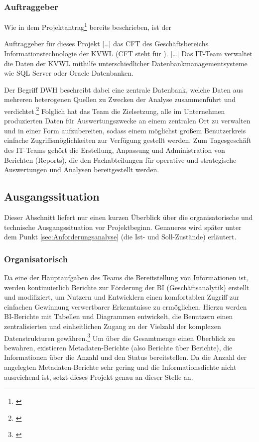 \subsubsection{Auftraggeber}\label{sec:Auftraggeber}
Wie in dem Projektantrag\footnote{\cite{Projektantrag}} bereits beschrieben, ist der
\begin{displayquote}
	Auftraggeber für dieses Projekt [\ldots] das \acs{CFT} \teamName des Geschäftsbereichs Informationstechnologie der \ac{KVWL} (\acs{CFT} steht für ).
	[\ldots]
	Das IT-Team \teamName verwaltet die Daten der \ac{KVWL} mithilfe unterschiedlicher Datenbankmanagementsysteme wie SQL Server oder Oracle Datenbanken.
\end{displayquote}
Der Begriff \ac{DWH} beschreibt dabei eine zentrale Datenbank, welche Daten aus mehreren heterogenen Quellen zu Zwecken der Analyse zusammenführt und verdichtet.\footnote{\Vgl \cite{wiki:dwh}}
Folglich hat das Team die Zielsetzung, alle im Unternehmen produzierten Daten für Auswertungszwecke an einem zentralen Ort zu verwalten und in einer Form aufzubereiten, sodass einem möglichst großem Benutzerkreis einfache Zugriffsmöglichkeiten zur Verfügung gestellt werden.
Zum Tagesgeschäft des IT-Teams \teamName gehört die Erstellung, Anpassung und Administration von Berichten (Reports), die den Fachabteilungen für operative und strategische Auswertungen und Analysen bereitgestellt werden.

\subsection{Ausgangssituation}\label{sec:Ausgangssituation}
Dieser Abschnitt liefert nur einen kurzen Überblick über die organisatorische und technische Ausgangssituation vor Projektbeginn. Genaueres wird später unter dem Punkt \ref{sec:Anforderungsanalyse} (\ua die Ist- und Soll-Zustände) erläutert.

\subsubsection{Organisatorisch}\label{sec:Ausgangssituation:Organisatorisch}
Da eine der Hauptaufgaben des Teams die Bereitstellung von Informationen ist, werden kontinuierlich Berichte zur Förderung der \ac{BI} (Geschäftsanalytik) erstellt und modifiziert, um Nutzern und Entwicklern einen komfortablen Zugriff zur einfachen Gewinnung verwertbarer Erkenntnisse zu ermöglichen. Hierzu werden \ac{BI}-Berichte mit Tabellen und Diagrammen entwickelt, die Benutzern einen zentralisierten und einheitlichen Zugang zu der Vielzahl der komplexen Datenstrukturen gewähren.\footnote{\Vgl \cite{Projektantrag}}
Um über die Gesamtmenge einen Überblick zu bewahren, existieren Metadaten-Berichte (also Berichte über Berichte), die \zB Informationen über die Anzahl und den Status bereitstellen.
Da die Anzahl der angelegten Metadaten-Berichte sehr gering und die Informationsdichte nicht ausreichend ist, setzt dieses Projekt genau an dieser Stelle an.

